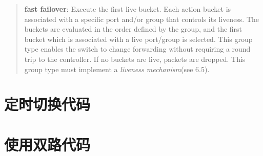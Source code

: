     \begin{quotation}
        \textbf{fast failover}: Execute the first live bucket. Each action bucket is associated with a specific
port and/or group that controls its liveness. The buckets are evaluated in the order defined by the
group, and the first bucket which is associated with a live port/group is selected. This group type
enables the switch to change forwarding without requiring a round trip to the controller. If no buckets
are live, packets are dropped. This group type must implement a \emph{liveness mechanism}(see 6.5).\cite{openflow13}
    \end{quotation}

    

    

    \appendix

    \section{定时切换代码}\label{sec:per5}


    \section{使用双路代码}\label{sec:balance}


